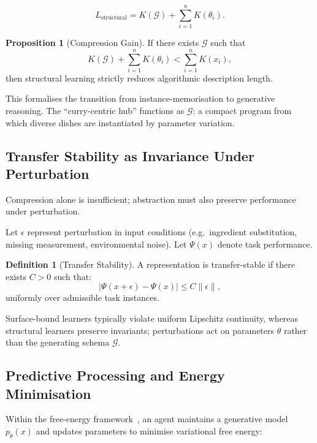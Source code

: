 \documentclass[12pt,a4paper]{article}
\theoremstyle{definition}
\newtheorem{definition}{Definition}[section]
\newtheorem{proposition}{Proposition}[section]
\begin{document}
\begin{equation}
  L_{\mathrm{structural}} = K(\mathcal{G}) + \sum_{i=1}^n K(\theta_i).
\end{equation}

\begin{proposition}[Compression Gain]
  If there exists $\mathcal{G}$ such that
  \begin{equation}
    K(\mathcal{G}) + \sum_{i=1}^n K(\theta_i)
    < \sum_{i=1}^n K(x_i),
  \end{equation}
  then structural learning strictly reduces algorithmic description length.
\end{proposition}

This formalises the transition from instance-memorisation to generative
reasoning.  The ``curry-centric hub'' functions as $\mathcal{G}$: a compact
program from which diverse dishes are instantiated by parameter variation.

\subsection{Transfer Stability as Invariance Under Perturbation}

Compression alone is insufficient; abstraction must also preserve performance
under perturbation.

Let $\epsilon$ represent perturbation in input conditions
(e.g.\ ingredient substitution, missing measurement, environmental noise).
Let $\Psi(x)$ denote task performance.

\begin{definition}[Transfer Stability]
  A representation is transfer-stable if there exists $C > 0$ such that:
  \begin{equation}
    |\Psi(x + \epsilon) - \Psi(x)|
    \leq C \|\epsilon\|,
  \end{equation}
  uniformly over admissible task instances.
\end{definition}

Surface-bound learners typically violate uniform Lipschitz continuity,
whereas structural learners preserve invariants; perturbations act on
parameters $\theta$ rather than the generating schema $\mathcal{G}$.

\subsection{Predictive Processing and Energy Minimisation}

Within the free-energy framework~\citep{friston2023}, an agent maintains a
generative model $p_\theta(x)$ and updates parameters to minimise variational
free energy:
\end{document}
